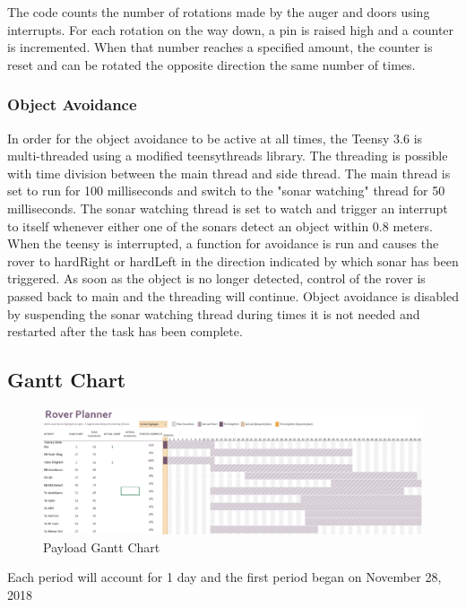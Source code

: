 \documentclass[journal,10pt,draftclsnofoot,onecolumn,compsoc]{IEEEtran} \usepackage[margin=0.75in]{geometry}
\begin{document}
The code counts the number of rotations made by the auger and doors using interrupts. For each rotation on the way down, a pin is raised high and a counter is incremented. When that number reaches a specified amount, the counter is reset and can be rotated the opposite direction the same number of times. 

\subsubsection{Object Avoidance}
In order for the object avoidance to be active at all times, the Teensy 3.6 is multi-threaded using a modified teensythreads library. The threading is possible with time division between the main thread and side thread. The main thread is set to run for 100 milliseconds and switch to the "sonar watching" thread for 50 milliseconds. The sonar watching thread is set to watch and trigger an interrupt to itself whenever either one of the sonars detect an object within 0.8 meters. When the teensy is interrupted, a function for avoidance is run and causes the rover to hardRight or hardLeft in the direction indicated by which sonar has been triggered. As soon as the object is no longer detected, control of the rover is passed back to main and the threading will continue. Object avoidance is disabled by suspending the sonar watching thread during times it is not needed and restarted after the task has been complete. 

\newpage
\begin{landscape}
\subsection{Gantt Chart}
\vspace{3cm}
\begin{figure}[ht]
    \centering
    \includegraphics[width = 1.3 \textwidth,angle=0]{PayloadGantz.PNG}
    \caption{Payload Gantt Chart}
    \label{fig:my_label}
\end{figure}
    Each period will account for 1 day and the first period began on November 28, 2018
\end{landscape}
\end{document}
